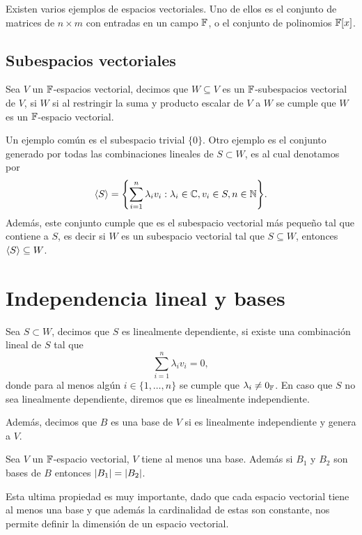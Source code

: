 Existen varios ejemplos de espacios vectoriales. Uno de ellos es el conjunto de matrices de $n \times m $ con entradas en un campo $\mathbb{F}$, o el conjunto de polinomios $\mathbb{F}[x]$.

\subsection{Subespacios vectoriales}

\begin{defi}
  Sea $V$ un $\mathbb{F}$-espacios vectorial, decimos que $W \subseteq V$ es un $\mathbb{F}$-subespacios vectorial de $V$, si $W$ si al restringir la suma y producto escalar de $V$ a $W$ se cumple que $W$ es un $\mathbb{F}$-espacio vectorial.
\end{defi}

Un ejemplo común es el subespacio trivial $\{0\}$. Otro ejemplo es el conjunto generado por todas las combinaciones lineales de $S \subset W$,  es al cual denotamos por
\[ \inner{S} = \set{ \sum_{i=1}^n \lambda_i v_i : \lambda_i \in \C, v_i \in S, n \in \N }. \]
Además, este conjunto cumple que es el subespacio vectorial más pequeño tal que contiene a $S$, es decir si $W$ es un subespacio vectorial tal que $S \subseteq W$, entonces $\langle S\rangle \subseteq W$.

\section{Independencia lineal y bases}

\begin{defi}
  Sea $S \subset W$, decimos que $S$ es linealmente dependiente, si existe una combinación lineal de $S$ tal que
  \[ \sum_{i=1}^n \lambda_i v_i = 0, \]
  donde para al menos algún $i \in \{1,\ldots,n\}$ se cumple que $\lambda_i \neq 0_{\mathbb{F}}$. En caso que $S$ no sea linealmente dependiente, diremos que es linealmente independiente.

  Además, decimos que $B$ es una base de $V$ si es linealmente independiente y genera a $V$.
\end{defi}


\begin{teor}
  Sea $V$ un $\mathbb{F}$-espacio vectorial, $V$ tiene al menos una base. Además si $B_1$ y $B_2$ son bases de $B$ entonces $\mathopen|B_1\mathclose| = \mathopen|B_2\mathclose|$.
\end{teor}

Esta ultima propiedad es muy importante, dado que cada espacio vectorial tiene al menos una base y que además la cardinalidad de estas son constante, nos permite definir la dimensión de un espacio vectorial.

